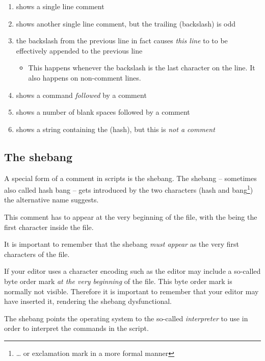 \documentclass{olli-handout}
\begin{document}
\begin{enumerate}
    \item shows a single line comment
    \item shows another single line comment, but the trailing \TTQ{\textbackslash} (backslash) is odd
    \item the backslash from the previous line in fact causes \emph{this line} to to be effectively appended to the previous line
    \begin{itemize}
        \item[\olliPenR] This happens whenever the backslash is the last character on the line. It also happens on non-comment lines.
    \end{itemize}
    \item shows a command \emph{followed} by a comment
    \item shows a number of blank spaces followed by a comment
    \item shows a string containing the \TTQ{\#} (hash), but this is \emph{not a comment}
\end{enumerate}

\subsection{The shebang}\label{shebang}

A special form of a comment in scripts is the shebang. The shebang -- sometimes also called hash bang -- gets introduced by the two characters \TTQ{\#!} (hash and bang\footnote{\ldots{} or exclamation mark in a more formal manner}) the alternative name suggests.

This comment has to appear at the very beginning of the file, with the \TTQ{\#} being the first character inside the file.

\begin{hintbox}
    {\olliPenR} It is important to remember that the shebang \emph{must appear} as the very first characters of the file.

    If your editor uses a character encoding such as  the editor may include a so-called byte order mark \emph{at the very beginning} of the file. This byte order mark is normally not visible. Therefore it is important to remember that your editor may have inserted it, rendering the shebang dysfunctional.
\end{hintbox}

The shebang points the operating system to the so-called \emph{interpreter} to use in order to interpret the commands in the script.
\end{document}
